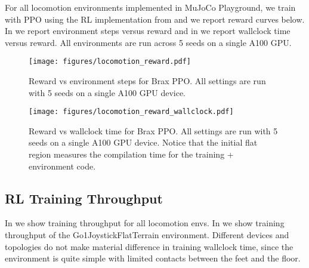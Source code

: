 For all locomotion environments implemented in MuJoCo Playground, we train with PPO using the RL implementation from \cite{freeman2021brax} and we report reward curves below. In  we report environment steps versus reward and in  we report wallclock time versus reward. All environments are run across 5 seeds on a single A100 GPU.

\begin{figure}[ht]
    \centering
    \texttt{[image: figures/locomotion\_reward.pdf]}
    \caption{\small Reward vs environment steps for Brax PPO. All settings are run with 5 seeds on a single A100 GPU device.}
    \label{fig:locomotion_step_reward}
\end{figure}

\begin{figure}[ht]
    \centering
    \texttt{[image: figures/locomotion\_reward\_wallclock.pdf]}
    \caption{\small Reward vs wallclock time for Brax PPO. All settings are run with 5 seeds on a single A100 GPU device. Notice that the initial flat region measures the compilation time for the training + environment code.}
    \label{fig:locomotion_time_reward}
\end{figure}

\subsection{RL Training Throughput}
\label{sec:appendix_locomotion_throughput}

In  we show training throughput for all locomotion envs. In  we show training throughput of the Go1JoystickFlatTerrain environment. Different devices and topologies do not make material difference in training wallclock time, since the environment is quite simple with limited contacts between the feet and the floor.

